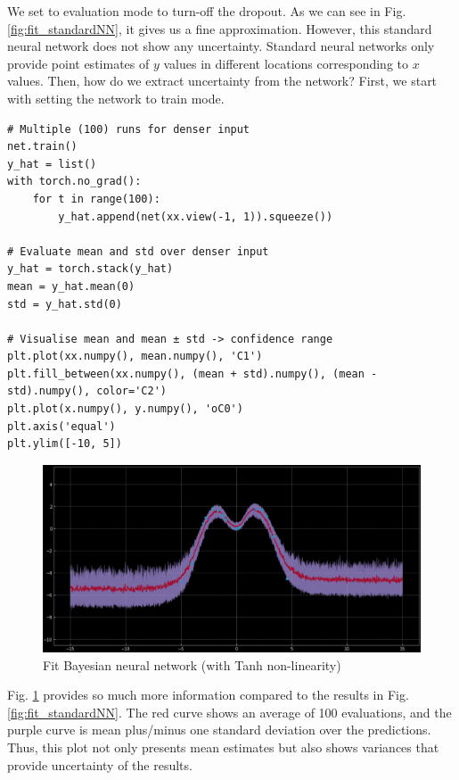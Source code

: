We set to evaluation mode to turn-off the dropout. As we can see in Fig. \ref{fig:fit_standardNN}, it gives us a fine approximation. However, this standard neural network does not show any uncertainty. Standard neural networks only provide point estimates of $y$ values in different locations corresponding to $x$ values. Then, how do we extract uncertainty from the network? First, we start with setting the network to train mode. 

\begin{verbatim}
# Multiple (100) runs for denser input
net.train()
y_hat = list()
with torch.no_grad():
    for t in range(100):
        y_hat.append(net(xx.view(-1, 1)).squeeze())
        
# Evaluate mean and std over denser input
y_hat = torch.stack(y_hat)
mean = y_hat.mean(0)
std = y_hat.std(0)

# Visualise mean and mean ± std -> confidence range
plt.plot(xx.numpy(), mean.numpy(), 'C1')
plt.fill_between(xx.numpy(), (mean + std).numpy(), (mean - std).numpy(), color='C2')
plt.plot(x.numpy(), y.numpy(), 'oC0')
plt.axis('equal')
plt.ylim([-10, 5])
\end{verbatim}

\begin{figure}[H]
    \centering
    \includegraphics[width=\textwidth]{figs/exp_3.png}
    \caption{Fit Bayesian neural network (with Tanh non-linearity)}
    \label{fig:fit_BayesianNN}
\end{figure}

Fig. \ref{fig:fit_BayesianNN} provides so much more information compared to the results in Fig. \ref{fig:fit_standardNN}. The red curve shows an average of 100 evaluations, and the purple curve is mean plus/minus one standard deviation over the predictions. Thus, this plot not only presents mean estimates but also shows variances that provide uncertainty of the results. 

